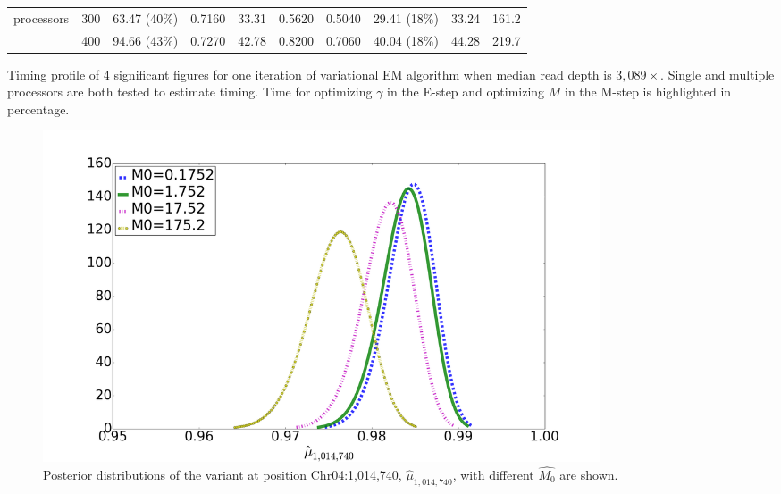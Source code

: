 \documentclass{bmcart}
\begin{document}
\begin{backmatter}
\begin{table}[htbp]
\begin{threeparttable}
\begin{tabular}{ccrrrrrrcc}
    processors & 300   & \multicolumn{1}{c}{63.47 (40\%)} & \multicolumn{1}{c}{0.7160} & \multicolumn{1}{c}{33.31} & \multicolumn{1}{c}{0.5620} & \multicolumn{1}{c}{0.5040} & \multicolumn{1}{c}{29.41 (18\%)} & 33.24 & 161.2 \\
          & 400   & \multicolumn{1}{c}{94.66 (43\%)} & \multicolumn{1}{c}{0.7270} & \multicolumn{1}{c}{42.78} & \multicolumn{1}{c}{0.8200} & \multicolumn{1}{c}{0.7060} & \multicolumn{1}{c}{40.04 (18\%)} & 44.28 & 219.7 \\
    \bottomrule
    \end{tabular}%
    \begin{tablenotes}
    \item Timing profile of 4 significant figures for one iteration of variational EM algorithm when median read depth is $3,089\times$.
Single and multiple processors are both tested to estimate timing. Time for optimizing $\gamma$ in the E-step and optimizing $M$ in the M-step is highlighted in percentage.
    \end{tablenotes}
    \end{threeparttable}
\end{table}%

\clearpage
\begin{figure}[htbp]
\centering
\includegraphics[width=0.8\textwidth]{M0.png}
\caption{
Posterior distributions of the variant at position Chr04:1,014,740, $\hat{\mu}_{1,014,740}$, with different $\hat{M_0}$ are shown.}
\end{figure}


\end{backmatter}
\end{document}
